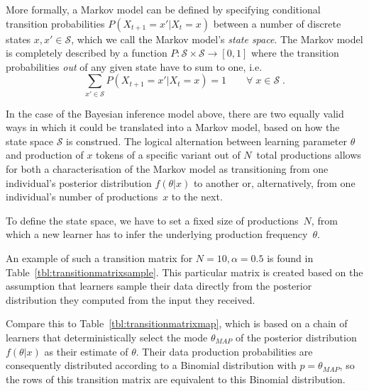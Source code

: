More formally, a Markov model can be defined by specifying conditional transition probabilities $P(X_{t+1}=x'|X_t=x)$ between a number of discrete states $x,x'\in\mathcal{S}$, which we call the Markov model's \emph{state space}. The Markov model is completely described by a function $P: \mathcal{S}\times\mathcal{S} \rightarrow [0,1]$ where the transition probabilities \emph{out} of any given state have to sum to one, i.e.
\begin{equation}
\sum_{x'\in\mathcal{S}} P(X_{t+1}=x'|X_t=x) = 1 \qquad\forall\; x \in \mathcal{S}\;.
\end{equation}

In the case of the Bayesian inference model above, there are two equally valid ways in which it could be translated into a Markov model, based on how the state space $\mathcal{S}$ is construed. The logical alternation between learning parameter $\theta$ and production of $x$ tokens of a specific variant out of $N$~total productions allows for both a characterisation of the Markov model as transitioning from one individual's posterior distribution $f(\theta|x)$ to another or, alternatively, from one individual's number of productions~$x$ to the next.


To define the state space, we have to set a fixed size of productions~$N$, from which a new learner has to infer the underlying production frequency~$\theta$.

An example of such a transition matrix for $N=10, \alpha=0.5$ is found in Table~\ref{tbl:transitionmatrixsample}. This particular matrix is created based on the assumption that learners sample their data directly from the posterior distribution they computed from the input they received.

Compare this to Table~\ref{tbl:transitionmatrixmap}, which is based on a chain of learners that deterministically select the mode $\theta_{MAP}$ of the posterior distribution $f(\theta|x)$ as their estimate of $\theta$. Their data production probabilities are consequently distributed according to a Binomial distribution with $p=\theta_{MAP}$, so the rows of this transition matrix are equivalent to this Binomial distribution.

